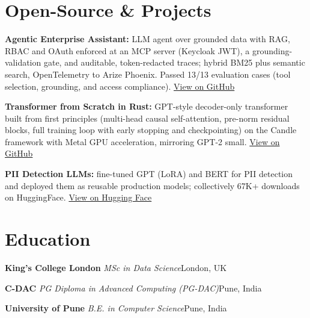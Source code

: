\documentclass[10pt,a4paper]{article}
\newcommand{\sep}{\,\textcolor{accent!60}{\textbar}\,}
\begin{document}
\section{Open-Source \& Projects}
\begin{tight}
  \item \textbf{Agentic Enterprise Assistant:} LLM agent over grounded data with RAG, RBAC and OAuth enforced at an MCP server (Keycloak JWT), a grounding-validation gate, and auditable, token-redacted traces; hybrid BM25 plus semantic search, OpenTelemetry to Arize Phoenix. Passed 13/13 evaluation cases (tool selection, grounding, and access compliance). \href{https://github.com/abhijeetscode/Agentic-Enterprise-Assistant}{View on GitHub}
  \item \textbf{Transformer from Scratch in Rust:} GPT-style decoder-only transformer built from first principles (multi-head causal self-attention, pre-norm residual blocks, full training loop with early stopping and checkpointing) on the Candle framework with Metal GPU acceleration, mirroring GPT-2 small. \href{https://github.com/abhijeetscode/transformer-rust}{View on GitHub}
  \item \textbf{PII Detection LLMs:} fine-tuned GPT (LoRA) and BERT for PII detection and deployed them as reusable production models; collectively 67K+ downloads on HuggingFace. \href{https://huggingface.co/ab-ai/pii_model}{View on Hugging Face}
\end{tight}

\section{Education}
{\color{company}\bfseries King's College London}\sep{\itshape MSc in Data Science}\hfill {\color{muted}London, UK}\par\vspace{1pt}
{\color{company}\bfseries C-DAC}\sep{\itshape PG Diploma in Advanced Computing (PG-DAC)}\hfill {\color{muted}Pune, India}\par\vspace{1pt}
{\color{company}\bfseries University of Pune}\sep{\itshape B.E. in Computer Science}\hfill {\color{muted}Pune, India}\par
\end{document}

